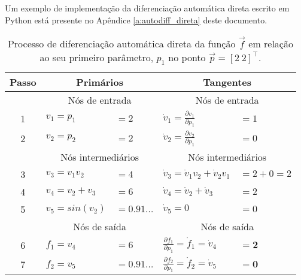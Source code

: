       Um exemplo de implementação da diferenciação automática direta escrito em Python está presente no Apêndice \ref{a:autodiff_direta} deste documento.

      \begin{table}[]
        \centering
        \begin{tabular}{@{}cllll@{}}
          \toprule
          \textbf{Passo} & \multicolumn{2}{c}{\textbf{Primários}}  & \multicolumn{2}{c}{\textbf{Tangentes}}                        \\  \midrule
            & \multicolumn{2}{c}{\color{gray} \footnotesize Nós de entrada}                    & \multicolumn{2}{c}{\color{gray} \footnotesize Nós de entrada}                                               \\
          {\color{gray} 1}     & $v_1 = p_1$                       & $=2$              & $\dot{v}_1 = \frac{\partial v_1}{\partial p_1}$             & $=1$       \\
          {\color{gray} 2}     & $v_2 = p_2$                       & $=2$              & $\dot{v}_2 = \frac{\partial v_2}{\partial p_1}$             & $=0$       \\
            & \multicolumn{2}{c}{\color{gray} \footnotesize Nós intermediários}                    & \multicolumn{2}{c}{\color{gray} \footnotesize Nós intermediários}                                               \\
          {\color{gray} 3}     & $v_3 = v_1 v_2$                   & $=4$                & $\dot{v}_3 = \dot{v}_1 v_2 + \dot{v}_2 v_1$                 & $= 2+0= 2$ \\
          {\color{gray} 4}     & $v_4 = v_2 + v_3$                 & $=6$                & $\dot{v}_4 = \dot{v}_2 + \dot{v}_3$                         & $=2$       \\
          {\color{gray} 5}     & $v_5 = sin(v_2)$                  & $=0.91\ldots$       & $\dot{v}_5 = 0$                                             & $= 0$      \\
            & \multicolumn{2}{c}{\color{gray} \footnotesize Nós de saída}                    & \multicolumn{2}{c}{\color{gray} \footnotesize Nós de saída}                                               \\
          {\color{gray} 6}     & $f_1 = v_4$            & $=6$               & $\frac{\partial f_1}{\partial p_1} = \dot{f}_1 = \dot{v}_4$ & $\boldsymbol{=2}$       \\
          {\color{gray} 7}     & $f_2 = v_5$   & $=0.91\ldots$               & $\frac{\partial f_2}{\partial p_1} = \dot{f}_2 = \dot{v}_5$ & $\boldsymbol{=0}$      \\ \bottomrule
        \end{tabular}
        \caption{Processo de diferenciação automática direta da função $\vec{f}$ em relação ao seu primeiro parâmetro, $p_1$ no ponto $\vec{p} = [2\ 2]^\top$.}
        \label{t:autodiff_direta_exemplo}
      \end{table}

